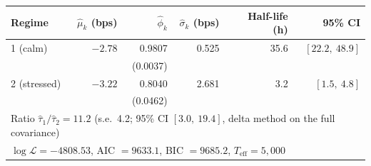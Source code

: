 \begin{tabular}{lrrrrr}
\toprule
Regime & $\hat\mu_k$ (bps) & $\hat\phi_k$ & $\hat\sigma_k$ (bps) & Half-life (h) & 95\% CI \\
\midrule
1 (calm)     & $-2.78$ & 0.9807 & 0.525 & 35.6 & $[22.2,\ 48.9]$ \\
             &         & (0.0037) &     &      &                 \\
2 (stressed) & $-3.22$ & 0.8040 & 2.681 & 3.2  & $[1.5,\ 4.8]$   \\
             &         & (0.0462) &     &      &                 \\
\midrule
\multicolumn{6}{l}{\footnotesize Ratio $\hat\tau_1/\hat\tau_2 = 11.2$ (s.e.\ 4.2; 95\% CI $[3.0,\ 19.4]$, delta method on the full covariance)} \\
\multicolumn{6}{l}{\footnotesize $\log\mathcal{L} = -4808.53$, AIC $= 9633.1$, BIC $= 9685.2$, $T_{\text{eff}} = 5{,}000$} \\
\bottomrule
\end{tabular}
